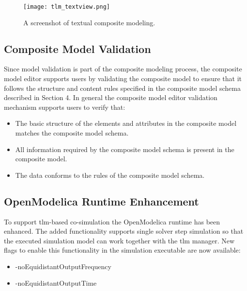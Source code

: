 \begin{landscape}
\begin{figure}
	\texttt{[image: tlm\_textview.png]}
	\caption{A screenshot of textual composite modeling.}
	\label{fig:tlmtextview}
\end{figure}
\end{landscape}

\subsection{Composite Model Validation}
\label{sec:tlmvalidation}

Since model validation is part of the composite modeling process, the composite model editor supports users by validating the composite model to ensure that it follows the structure and content rules specified in the composite model schema described in Section 4. In general the composite model
editor validation mechanism supports users to verify that: 

\begin{itemize}

\item The basic structure of the elements and attributes in the composite model matches the composite model schema.
\item All information required by the composite model schema is present in the composite model.
\item The data conforms to the rules of the composite model schema.

\end{itemize}

\subsection{OpenModelica Runtime Enhancement}
\label{sec:tlmruntime}

To support \acrshort{tlm}-based co-simulation the OpenModelica runtime has been enhanced. The added
functionality supports single solver step simulation so that the executed simulation model can work together
with the \acrshort{tlm} manager. New flags to enable this functionality in the simulation executable are now available:

\begin{itemize}
		
\item -noEquidistantOutputFrequency
\item -noEquidistantOutputTime

\end{itemize}

